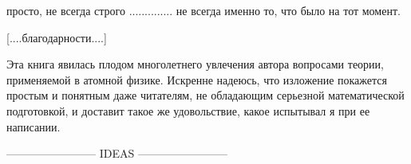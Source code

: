 просто, не всегда строго .............. не всегда именно то, что было на тот момент.


[....благодарности....]

Эта книга явилась плодом многолетнего увлечения автора вопросами теории, применяемой в атомной физике. 
Искренне надеюсь, что изложение покажется простым и понятным даже читателям, не обладающим серьезной математической подготовкой, и доставит такое же удовольствие, какое испытывал я при ее написании.

------------------------ IDEAS ------------------------ 
















